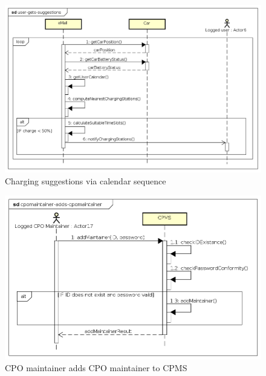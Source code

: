\begin{figure}[!h]
    \begin{center}
        \includegraphics[keepaspectratio, width=16cm]{Sequence/user-gets-suggestions.png}
        \caption{Charging suggestions via calendar sequence}
    \end{center}
\end{figure}
\begin{figure}[!h]
    \begin{center}
        \includegraphics[keepaspectratio, width=16cm]{Sequence/cpomaintainer-adds-cpomaintainer.png}
        \caption{\ac{CPO} maintainer adds \ac{CPO} maintainer to \ac{CPMS}}
    \end{center}
\end{figure}
